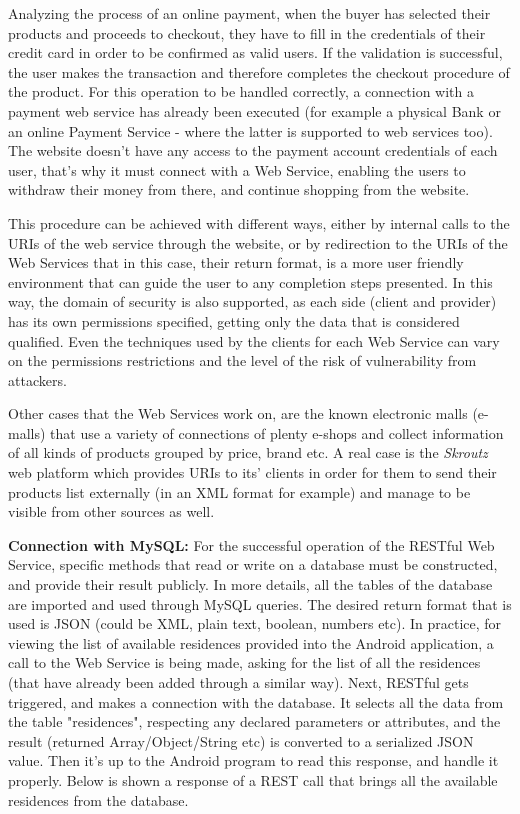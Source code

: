 \documentclass[12pt]{article}
\begin{document}
	Analyzing the process of an online payment, when the buyer has selected their products and proceeds to checkout, they have to fill in the credentials of their credit card in order to be confirmed as valid users. If the validation is successful, the user makes the transaction and therefore completes the checkout procedure of the product. For this operation to be handled correctly, a connection with a payment web service has already been executed (for example a physical Bank or an online Payment Service - where the latter is supported to web services too). The website doesn't have any access to the payment account credentials of each user, that's why it must connect with a Web Service, enabling the users to withdraw their money from there, and continue shopping from the website. 
	
	This procedure can be achieved with different ways, either by internal calls to the URIs of the web service through the website, or by redirection to the URIs of the Web Services that in this case, their return format, is a more user friendly environment that can guide the user to any completion steps presented. In this way, the domain of security is also supported, as each side (client and provider) has its own permissions specified, getting only the data that is considered qualified. Even the techniques used by the clients for each Web Service can vary on the permissions restrictions and the level of the risk of vulnerability from attackers.
	
	Other cases that the Web Services work on, are the known electronic malls (e-malls) that use a variety of connections of plenty e-shops and collect information of all kinds of products grouped by price, brand etc. A real case is the \textit{Skroutz} web platform which provides URIs to its' clients in order for them to send their products list externally (in an XML format for example) and manage to be visible from other sources as well.
	
	\textbf{Connection with MySQL:} For the successful operation of the RESTful Web Service, specific methods that read or write on a database must be constructed, and provide their result publicly. In more details, all the tables of the database are imported and used through MySQL queries. The desired return format that is used is JSON (could be XML, plain text, boolean, numbers etc). In practice, for viewing the list of available residences provided into the Android application, a call to the Web Service is being made, asking for the list of all the residences (that have already been added through a similar way). Next, RESTful gets triggered, and makes a connection with the database. It selects all the data from the table "residences", respecting any declared parameters or attributes, and the result (returned Array/Object/String etc) is converted to a serialized JSON value. Then it's up to the Android program to read this response, and handle it properly. Below is shown a response of a REST call that brings all the available residences from the database.
	
\end{document}
